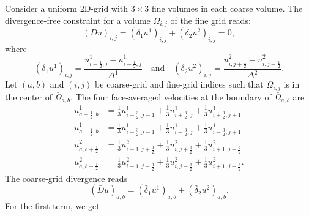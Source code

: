\documentclass[preprint]{elsarticle}
\begin{document}
Consider a uniform 2D-grid with $3 \times 3$ fine volumes in each coarse volume.
The divergence-free constraint for a volume $\Omega_{i, j}$ of the fine grid reads:
\begin{equation}
    (D u)_{i, j} = (\delta_1 u^1)_{i, j} + (\delta_2 u^2)_{i, j} = 0,
\end{equation}
where
\begin{equation}
    (\delta_1 u^1)_{i, j} =
    \frac{u^1_{i + \frac{1}{2}, j} - u^1_{i - \frac{1}{2}, j}}{\Delta^1}
    \quad \text{and} \quad
    (\delta_2 u^2)_{i, j} =
    \frac{u^2_{i, j + \frac{1}{2}} - u^2_{i, j - \frac{1}{2}}}{\Delta^2}.
\end{equation}
Let $(a, b)$ and $(i, j)$ be coarse-grid and fine-grid indices such that
$\Omega_{i, j}$ is in the center of $\bar{\Omega}_{a, b}$. The four
face-averaged velocities at the boundary of $\bar{\Omega}_{a, b}$ are
\begin{equation}
\begin{split}
    \bar{u}^1_{a + \frac{1}{2}, b}
    & = \tfrac{1}{3} u^1_{i + \frac{3}{2}, j - 1}
    + \tfrac{1}{3} u^1_{i + \frac{3}{2}, j}
    + \tfrac{1}{3} u^1_{i + \frac{3}{2}, j + 1} \\
    \bar{u}^1_{a - \frac{1}{2}, b} & = \tfrac{1}{3} u^1_{i - \frac{3}{2}, j - 1}
    + \tfrac{1}{3} u^1_{i - \frac{3}{2}, j}
    + \tfrac{1}{3} u^1_{i - \frac{3}{2}, j + 1} \\
    \bar{u}^2_{a, b + \frac{1}{2}} & = \tfrac{1}{3} u^2_{i - 1, j + \frac{3}{2}}
    + \tfrac{1}{3} u^2_{i, j + \frac{3}{2}}
    + \tfrac{1}{3} u^2_{i + 1, j + \frac{3}{2}} \\
    \bar{u}^2_{a, b - \frac{1}{2}} & = \tfrac{1}{3} u^2_{i - 1, j - \frac{3}{2}}
    + \tfrac{1}{3} u^2_{i, j - \frac{3}{2}}
    + \tfrac{1}{3} u^2_{i + 1, j - \frac{3}{2}}.
\end{split}
\end{equation}
The coarse-grid divergence reads
\begin{equation}
    (\bar{D} \bar{u})_{a, b} =
    (\bar{\delta}_1 \bar{u}^1)_{a, b} +
    (\bar{\delta}_2 \bar{u}^2)_{a, b}.
\end{equation}
For the first term, we get
\end{document}
